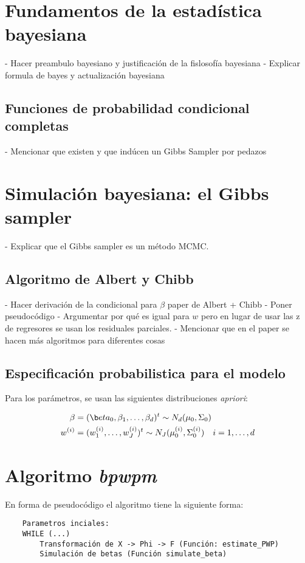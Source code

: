 \documentclass[../Main/Main.tex]{subfiles}
\begin{document}
\section{Fundamentos de la estadística bayesiana}

- Hacer preambulo bayesiano y justificación de la fislosofía bayesiana
- Explicar formula de bayes y actualización bayesiana

\subsection{Funciones de probabilidad condicional completas}
- Mencionar que existen y que indúcen un Gibbs Sampler por pedazos

\section{Simulación bayesiana: el Gibbs sampler}
- Explicar que el Gibbs sampler es un método MCMC.

\subsection{Algoritmo de Albert y Chibb}
- Hacer derivación de la condicional para $\beta$ paper de Albert + Chibb
- Poner pseudocódigo
- Argumentar por qué es igual para $w$ pero en lugar de usar las z de regresores se usan los residuales parciales.
- Mencionar que en el paper se hacen más algoritmos para diferentes cosas

\subsection{Especificación probabilistica para el modelo}
Para los parámetros, se usan las siguientes distribuciones \textit{apriori}:

\begin{align}
	\mathbf{\beta} &= (\b	eta_0,\beta_1,\ldots,\beta_d)^t \sim N_d(\mu_0, \Sigma_0) \\
	w\superi &= (w\superi_1,\ldots,w\superi_J)^t \sim N_J(\mu\superi_0,\Sigma\superi_0) \quad i=1,\ldots,d
\end{align}

\section{Algoritmo \textit{bpwpm}}
En forma de pseudocódigo el algoritmo tiene la siguiente forma:
\begin{verbatim}
    Parametros inciales: 
    WHILE (...)
        Transformación de X -> Phi -> F (Función: estimate_PWP)		
        Simulación de betas (Función simulate_beta)
\end{verbatim} 
\end{document}
